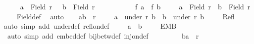 \begin{isabellebody}
\ \ \isamarkupfalse%
\ {\isacharasterisk}{\kern0pt}{\isacharcolon}{\kern0pt}\ {\isachardoublequoteopen}a\ {\isasymin}\ Field\ r{\isachardoublequoteclose}\ \ {\isacharasterisk}{\kern0pt}{\isacharasterisk}{\kern0pt}{\isacharcolon}{\kern0pt}\ {\isachardoublequoteopen}b\ {\isasymin}\ Field\ r{\isachardoublequoteclose}\ \isanewline
\ \ \ \ \ \ \ \ \ {\isacharasterisk}{\kern0pt}{\isacharasterisk}{\kern0pt}{\isacharasterisk}{\kern0pt}{\isacharcolon}{\kern0pt}\ {\isachardoublequoteopen}f\ a\ {\isacharequal}{\kern0pt}\ f\ b{\isachardoublequoteclose}\isanewline
\ \ \isamarkupfalse%
\ {}{\isacharcolon}{\kern0pt}\ {\isachardoublequoteopen}a\ {\isasymin}\ Field\ r\ {\isasymand}\ b\ {\isasymin}\ Field\ r{\isachardoublequoteclose}\isanewline
\ \ \isamarkupfalse%
\ Field{\isacharunderscore}{\kern0pt}def\ \isamarkupfalse%
\ auto\isanewline
\ \ \isacommand{{\isacharbraceleft}{\kern0pt}}\isamarkupfalse%
\isamarkupfalse%
\ {\isachardoublequoteopen}{\isacharparenleft}{\kern0pt}a{\isacharcomma}{\kern0pt}b{\isacharparenright}{\kern0pt}\ {\isasymin}\ r{\isachardoublequoteclose}\isanewline
\ \ \ \isamarkupfalse%
\ {\isachardoublequoteopen}a\ {\isasymin}\ under\ r\ b\ {\isasymand}\ b\ {\isasymin}\ under\ r\ b{\isachardoublequoteclose}\isanewline
\ \ \ \isamarkupfalse%
\ Refl\ \isamarkupfalse%
{\isacharparenleft}{\kern0pt}auto\ simp\ add{\isacharcolon}{\kern0pt}\ under{\isacharunderscore}{\kern0pt}def\ refl{\isacharunderscore}{\kern0pt}on{\isacharunderscore}{\kern0pt}def{\isacharparenright}{\kern0pt}\isanewline
\ \ \ \isamarkupfalse%
\ {\isachardoublequoteopen}a\ {\isacharequal}{\kern0pt}\ b{\isachardoublequoteclose}\isanewline
\ \ \ \isamarkupfalse%
\ EMB\ {}\ {\isacharasterisk}{\kern0pt}{\isacharasterisk}{\kern0pt}{\isacharasterisk}{\kern0pt}\isanewline
\ \ \ \isamarkupfalse%
\ {\isacharparenleft}{\kern0pt}auto\ simp\ add{\isacharcolon}{\kern0pt}\ embed{\isacharunderscore}{\kern0pt}def\ bij{\isacharunderscore}{\kern0pt}betw{\isacharunderscore}{\kern0pt}def\ inj{\isacharunderscore}{\kern0pt}on{\isacharunderscore}{\kern0pt}def{\isacharparenright}{\kern0pt}\isanewline
\ \ \isacommand{{\isacharbraceright}{\kern0pt}}\isamarkupfalse%
\isanewline
\ \ \isamarkupfalse%
\isanewline
\ \ \isacommand{{\isacharbraceleft}{\kern0pt}}\isamarkupfalse%
\isamarkupfalse%
\ {\isachardoublequoteopen}{\isacharparenleft}{\kern0pt}b{\isacharcomma}{\kern0pt}a{\isacharparenright}{\kern0pt}\ {\isasymin}\ r{\isachardoublequoteclose}\isanewline

\end{isabellebody}
